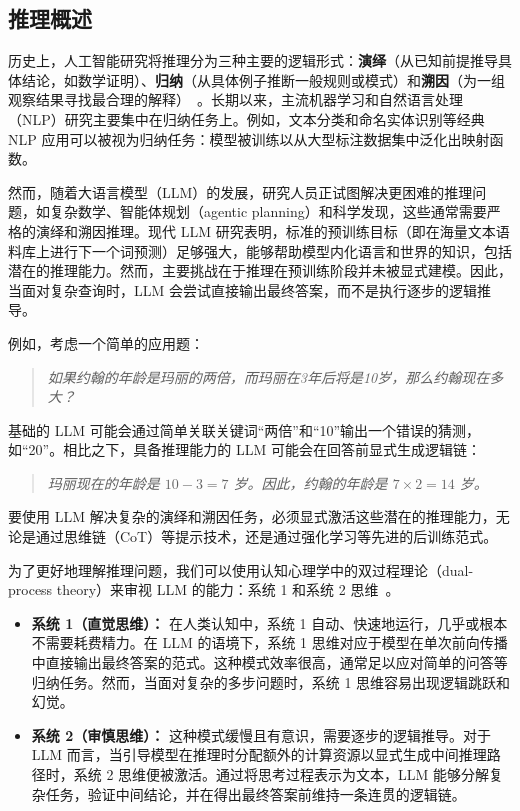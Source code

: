 
\subsection{推理概述}

历史上，人工智能研究将推理分为三种主要的逻辑形式：\textbf{演绎}（从已知前提推导具体结论，如数学证明）、\textbf{归纳}（从具体例子推断一般规则或模式）和\textbf{溯因}（为一组观察结果寻找最合理的解释）~\cite{peirce1931:collected}。长期以来，主流机器学习和自然语言处理（NLP）研究主要集中在归纳任务上。例如，文本分类和命名实体识别等经典 NLP 应用可以被视为归纳任务：模型被训练以从大型标注数据集中泛化出映射函数。

然而，随着大语言模型（LLM）的发展，研究人员正试图解决更困难的推理问题，如复杂数学、智能体规划（agentic planning）和科学发现，这些通常需要严格的演绎和溯因推理。现代 LLM 研究表明，标准的预训练目标（即在海量文本语料库上进行下一个词预测）足够强大，能够帮助模型内化语言和世界的知识，包括潜在的推理能力。然而，主要挑战在于推理在预训练阶段并未被显式建模。因此，当面对复杂查询时，LLM 会尝试直接输出最终答案，而不是执行逐步的逻辑推导。

例如，考虑一个简单的应用题：

\begin{quote}
\textit{如果约翰的年龄是玛丽的两倍，而玛丽在3年后将是10岁，那么约翰现在多大？}
\end{quote}

基础的 LLM 可能会通过简单关联关键词“两倍”和“10”输出一个错误的猜测，如“20”。相比之下，具备推理能力的 LLM 可能会在回答前显式生成逻辑链：

\begin{quote}
\textit{玛丽现在的年龄是 $10 - 3 = 7$ 岁。因此，约翰的年龄是 $7 \times 2 = 14$ 岁。}
\end{quote}

要使用 LLM 解决复杂的演绎和溯因任务，必须显式激活这些潜在的推理能力，无论是通过思维链（CoT）等提示技术，还是通过强化学习等先进的后训练范式。

为了更好地理解推理问题，我们可以使用认知心理学中的双过程理论（dual-process theory）来审视 LLM 的能力：系统 1 和系统 2 思维~\cite{kahneman:2011thinking}。

\begin{itemize}
\item \vspace{0.5cm} \textbf{系统 1（直觉思维）：} 在人类认知中，系统 1 自动、快速地运行，几乎或根本不需要耗费精力。在 LLM 的语境下，系统 1 思维对应于模型在单次前向传播中直接输出最终答案的范式。这种模式效率很高，通常足以应对简单的问答等归纳任务。然而，当面对复杂的多步问题时，系统 1 思维容易出现逻辑跳跃和幻觉。
\item \vspace{0.3cm} \textbf{系统 2（审慎思维）：} 这种模式缓慢且有意识，需要逐步的逻辑推导。对于 LLM 而言，当引导模型在推理时分配额外的计算资源以显式生成中间推理路径时，系统 2 思维便被激活。通过将思考过程表示为文本，LLM 能够分解复杂任务，验证中间结论，并在得出最终答案前维持一条连贯的逻辑链。
\end{itemize}
\vspace{0.3cm}

